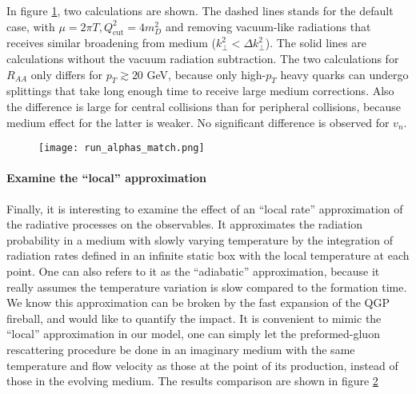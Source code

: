 In figure \ref{fig:new:run-match}, two calculations are shown. 
The dashed lines stands for the default case, with $\mu=2\pi T, Q_{\textrm{cut}}^2=4m_D^2$ and removing vacuum-like radiations that receives similar broadening from medium ($k_\perp^2 < \Delta k_\perp^2$).
The solid lines are calculations without the vacuum radiation subtraction.
The two calculations for $R_{AA}$ only differs for $p_T\gtrsim 20$ GeV, because only high-$p_T$ heavy quarks can undergo splittings that take long enough time to receive large medium corrections.
Also the difference is large for central collisions than for peripheral collisions, because medium effect for the latter is weaker.
No significant difference is observed for $v_n$.

\begin{figure}
\centering
\texttt{[image: run\_alphas\_match.png]}
\caption{}
\label{fig:new:run-match}
\end{figure}

\paragraph{Examine the ``local'' approximation}
Finally, it is interesting to examine the effect of an ``local rate'' approximation of the radiative processes on the observables.
It approximates the radiation probability in a medium with slowly varying temperature by the integration of radiation rates defined in an infinite static box with the local temperature at each point.
One can also refers to it as the ``adiabatic'' approximation, because it really assumes the temperature variation is slow compared to the formation  time.
We know this approximation can be broken by the fast expansion of the QGP fireball, and would like to quantify the impact.
It is convenient to mimic the ``local'' approximation in our model, one can simply let the preformed-gluon rescattering procedure be done in an imaginary medium with the same temperature and flow velocity as those at the point of its production, instead of those in the evolving medium.
The results comparison are shown in figure \ref{fig:new:run-local}



\begin{figure}
\centering
\caption{}
\label{fig:new:run-local}
\end{figure}
